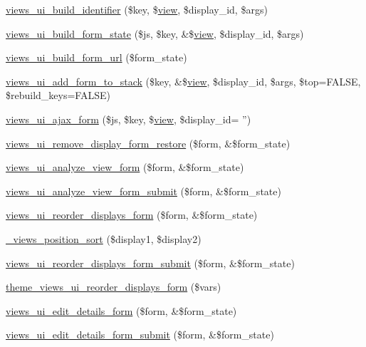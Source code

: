 \begin{DoxyCompactItemize}
\item 
\hyperlink{admin_8inc_a70be38405376cc28c9f3c53643ae8581}{views\_\-ui\_\-build\_\-identifier} (\$key, \$\hyperlink{classview}{view}, \$display\_\-id, \$args)
\item 
\hyperlink{admin_8inc_afc1eec863da7b425bae3b0509fe17e4d}{views\_\-ui\_\-build\_\-form\_\-state} (\$js, \$key, \&\$\hyperlink{classview}{view}, \$display\_\-id, \$args)
\item 
\hyperlink{admin_8inc_a89ecd86607b4c1d1928120aaa1004c0d}{views\_\-ui\_\-build\_\-form\_\-url} (\$form\_\-state)
\item 
\hyperlink{admin_8inc_aae9aad849e9069d6a717bc78e0a468b0}{views\_\-ui\_\-add\_\-form\_\-to\_\-stack} (\$key, \&\$\hyperlink{classview}{view}, \$display\_\-id, \$args, \$top=FALSE, \$rebuild\_\-keys=FALSE)
\item 
\hyperlink{admin_8inc_a9469fe3e11f533b7cd255191f4b1ac7e}{views\_\-ui\_\-ajax\_\-form} (\$js, \$key, \$\hyperlink{classview}{view}, \$display\_\-id= '')
\item 
\hyperlink{admin_8inc_a85640b9f63281c89ed546c623c22c776}{views\_\-ui\_\-remove\_\-display\_\-form\_\-restore} (\$form, \&\$form\_\-state)
\item 
\hyperlink{admin_8inc_ab554cb570b901a617cdaf7deb73e809d}{views\_\-ui\_\-analyze\_\-view\_\-form} (\$form, \&\$form\_\-state)
\item 
\hyperlink{admin_8inc_aa1090e8a74ff37716f6b2365f188c73b}{views\_\-ui\_\-analyze\_\-view\_\-form\_\-submit} (\$form, \&\$form\_\-state)
\item 
\hyperlink{admin_8inc_a57e9957bb8e9d4c1b1cbce89e6150d47}{views\_\-ui\_\-reorder\_\-displays\_\-form} (\$form, \&\$form\_\-state)
\item 
\hyperlink{admin_8inc_a8057a3d0c936aececdcef9019d2a5eb0}{\_\-views\_\-position\_\-sort} (\$display1, \$display2)
\item 
\hyperlink{admin_8inc_aae24eefaa1669ab2602066dbb0dc088f}{views\_\-ui\_\-reorder\_\-displays\_\-form\_\-submit} (\$form, \&\$form\_\-state)
\item 
\hyperlink{admin_8inc_a202109172df00c7577cdc8e3417f8c0f}{theme\_\-views\_\-ui\_\-reorder\_\-displays\_\-form} (\$vars)
\item 
\hyperlink{admin_8inc_ab0f223be50ef20fa53912b0eb128e7ee}{views\_\-ui\_\-edit\_\-details\_\-form} (\$form, \&\$form\_\-state)
\item 
\hyperlink{admin_8inc_a674154b3d2a6a378f121ec2f0a66d52c}{views\_\-ui\_\-edit\_\-details\_\-form\_\-submit} (\$form, \&\$form\_\-state)

\end{DoxyCompactItemize}
